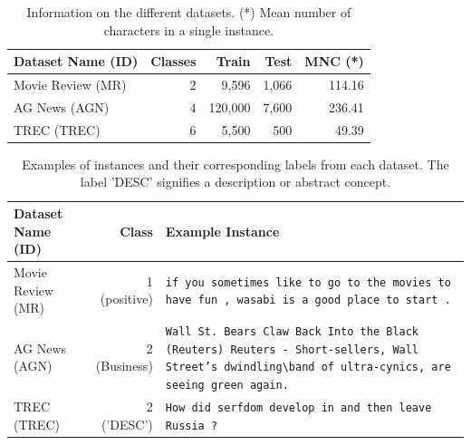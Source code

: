 \documentclass[english,bachelor,ul]{webisthesis} %
\begin{document}
\vspace{1\baselineskip}

\begin{table}[htpb]
    \centering
    \setlength{\tabcolsep}{16pt} %
    \begin{tabular}{@{}lrrrr@{}} %
        \toprule
        \bfseries Dataset Name \scriptsize (ID) & \bfseries Classes & \bfseries Train & \bfseries Test & \bfseries MNC (*) \\
        \midrule
        Movie Review \scriptsize (MR) & 2 & 9,596 & 1,066 & 114.16 \\
        AG News \scriptsize (AGN) & 4 & 120,000 & 7,600 &  236.41 \\
        TREC \scriptsize (TREC) & 6 & 5,500 & 500 & 49.39 \\
        \bottomrule
    \end{tabular}
    \caption{Information on the different datasets. (*) Mean number of characters in a single instance.}
  \label{tab:dataset-table}%
\end{table}

\vspace{1\baselineskip}

\begin{table}[htbp]
    \centering
    \renewcommand{\arraystretch}{1.5}
    \begin{tabular}{@{}lrp{7cm}@{}} 
        \toprule
        \textbf{Dataset Name} \scriptsize (ID) & \textbf{Class} & \textbf{Example Instance} \\
        \midrule
        Movie Review \scriptsize (MR) & 1 (positive) & \texttt{if you sometimes like to go to the movies to have fun , wasabi is a good place to start .} \\
        AG News \scriptsize (AGN) & 2  (Business) & \texttt{Wall St. Bears Claw Back Into the Black (Reuters) Reuters - Short-sellers, Wall Street's dwindling\textbackslash band of ultra-cynics, are seeing green again.} \\
        TREC \scriptsize (TREC) & 2 ('DESC') & \texttt{How did serfdom develop in and then leave Russia ?} \\
        \bottomrule
    \end{tabular}
    \caption{Examples of instances and their corresponding labels from each dataset. The label 'DESC' signifies a description or abstract concept.}
    \label{tab:dataset-instances}
\end{table}
\end{document}

